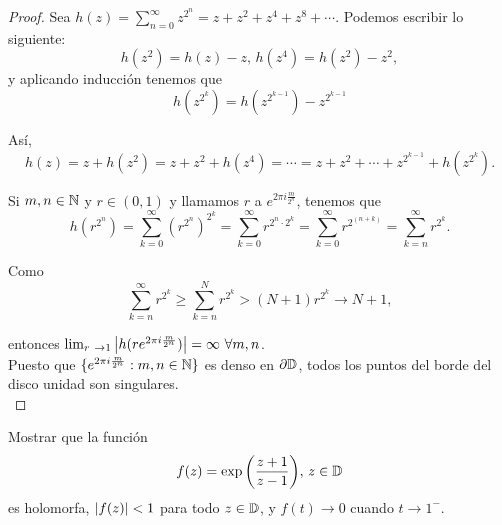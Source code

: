 \begin{proof}
     Sea $h(z) = \sum_{n=0}^{\infty} z^{2^n} = z + z^2 + z^4 + z^8 + \cdots$. Podemos escribir lo siguiente:
    \begin{equation*}
         h(z^2) = h(z) - z, \,
         h(z^4) = h(z^2) - z^2,
    \end{equation*}
    y aplicando inducción tenemos que
    \begin{equation*}
        h(z^{2^k}) = h(z^{2^{k-1}}) - z^{2^{k-1}}
    \end{equation*}

    Así,
    \begin{equation*}
        h(z) = z + h(z^2) = z + z^2 + h(z^4) = \cdots = z + z^2 + \cdots + z^{2^{k-1}} + h(z^{2^k}).
    \end{equation*}

    Si $m, n \in \mathbb{N}$ y $r \in (0,1)$ y llamamos $r$ a $e^{2 \pi i \frac{m}{2^n}}$, tenemos que
    \begin{equation*}
        h(r^{2^n}) = \sum_{k=0}^{\infty} (r^{2^n})^{2^k} = \sum_{k=0}^{\infty} r^{2^n \cdot 2^k} = \sum_{k=0}^{\infty} r^{2^{(n+k)}} =  \sum_{k=n}^{\infty} r^{2^k}.
    \end{equation*}

    Como
    \begin{equation*}
        \sum_{k=n}^{\infty} r^{2^k} \geq \sum_{k=n}^{N} r^{2^k} > (N + 1) r^{2^k} \to N + 1,
    \end{equation*}

    entonces $\lim_{r \to 1} \abs{h(re^{2 \pi i \frac{m}{2^n}})} = \infty \, \, \forall m, n$. \\

    Puesto que $\{e^{2 \pi i \frac{m}{2^n}} : m, n \in \mathbb{N}\}$ es denso en $\partial \mathbb{D}$, todos los puntos del borde del disco unidad son singulares. \\
\end{proof}


\begin{example}
    \label{ex:exp}
    Mostrar que la función
    \begin{equation*}
        f(z) = \exp{\left(\frac{z + 1}{z - 1}\right)}, \, z \in \mathbb{D}
    \end{equation*}
    es holomorfa, $\left\lvert f(z)\right\rvert < 1$ para todo $z \in \mathbb{D}$, y $f(t) \to 0$ cuando $t \to 1^-$. %
\end{example}


